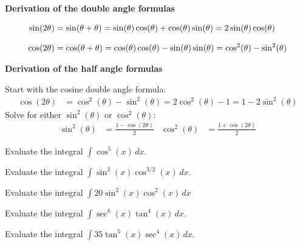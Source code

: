 \documentclass[../mathNotesPreamble]{subfiles}
\begin{document}
  \textbf{Derivation of the double angle formulas}

  \begin{align*}
    \sin(2\theta)&=\sin(\theta+\theta)
      =\sin(\theta)\cos(\theta)+\cos(\theta)\sin(\theta)
      =2\sin(\theta)\cos(\theta)\\[0.5\baselineskip]
    \cos(2\theta)&=\cos(\theta+\theta)
      =\cos(\theta)\cos(\theta)-\sin(\theta)\sin(\theta)
      =\cos^2(\theta)-\sin^2(\theta)
  \end{align*}

  \textbf{Derivation of the half angle formulas}

  \noindent
  Start with the cosine double angle formula:
  \begin{align*}
    \cos(2\theta)&=\cos^2(\theta)-\sin^2(\theta)
      =\boxed{2\cos^2(\theta)-1}
      =\boxed{1-2\sin^2(\theta)}
  \end{align*}
  Solve for either $\sin^2(\theta)$ or $\cos^2(\theta)$:
  \begin{align*}
    \sin^2(\theta)&=\frac{1-\cos(2\theta)}{2}&
    \cos^2(\theta)&=\frac{1+\cos(2\theta)}{2}
  \end{align*}
  \pagebreak

  \begin{ex*}
    Evaluate the integral $\displaystyle \int \cos^5(x)\,dx$.
  \end{ex*}
  \pagebreak

  \begin{ex*}
    Evaluate the integral $\displaystyle \int\sin^3(x)\cos^{3/2}(x)\,dx$.
  \end{ex*}
  \pagebreak

  \begin{ex*}
    Evaluate the integral $\displaystyle \int 20\sin^2(x)\cos^2(x)\,dx$
  \end{ex*}
  \pagebreak

  \begin{ex*}
    Evaluate the integral $\displaystyle \int\sec^6(x)\tan^4(x)\,dx$.
  \end{ex*}
  \pagebreak

  \begin{ex*}
    Evaluate the integral $\displaystyle \int 35\tan^5(x)\sec^4(x)\,dx$.
  \end{ex*}
  \pagebreak
\end{document}
